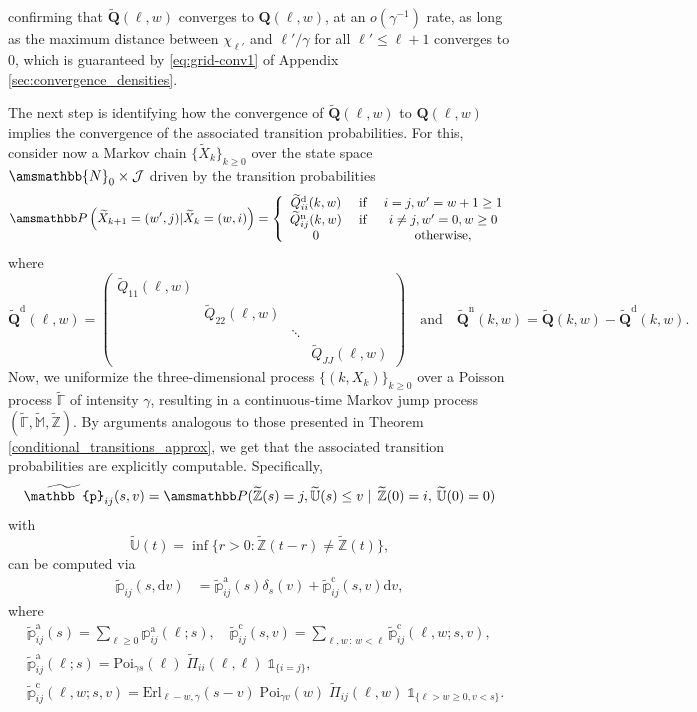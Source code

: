 \documentclass[11pt,leqno]{amsart}
\numberwithin{table}{section}
\numberwithin{figure}{section}
\numberwithin{equation}{section}
\newcommand{\dd}{\mathrm{d}}
\newcommand{\1}{{\mathds{1}}}
\newcommand{\0}{\mat{0}}
\newcommand{\N}{\amsmathbb{N}}
\renewcommand{\P }{{\amsmathbb P}}
\newcommand{\ap}[1]{\mathbb{#1}}
\newcommand{\tld}[1]{\widetilde{#1}}
\newcommand{\apt}[1]{\tld{\mathbb{#1}}}
\begin{document}
confirming that $\tld{\bm{Q}}(\ell,w)$ converges to $\bm{Q}(\ell,w)$, at an $o(\gamma^{-1})$ rate, as long as the maximum distance between $\chi_{\ell'}$ and $\ell'/\gamma$ for all $\ell'\le \ell +1$ converges to $0$, which is guaranteed by \eqref{eq:grid-conv1} of Appendix \ref{sec:convergence_densities}. 

The next step is identifying how the convergence of $\tld{\bm{Q}}(\ell,w)$ to $\bm{Q}(\ell,w)$ implies the convergence of the associated transition probabilities. For this, consider now a Markov chain $\{\tld{X}_k\}_{k\ge 0}$ over the state space $\N_0\times \mathcal{J}$ driven by the transition probabilities
\begin{align*}\P \left(\tld{X}_{k+1}=(w',j)|\tld{X}_{k}=(w,i)\right) = \left\{\begin{array}{ccc}\tld{Q}^{\mathrm{d}}_{ii}(k,w)&\mbox{ if }&i=j, w'=w+1\ge 1\\
\tld{Q}^{\mathrm{n}}_{ij}(k,w)&\mbox{ if }&i\neq j, w'= 0, w\ge 0\\
0&&\mbox{otherwise},\end{array}\right.\end{align*}
where 
\[\tld{\bm{Q}}^{\mathrm{d}}(\ell, w)=\begin{pmatrix} \tld{Q}_{11}(\ell, w)& &&\\&\tld{Q}_{22}(\ell, w)&&\\ &&\ddots& \\ &&& \tld{Q}_{JJ}(\ell, w)\end{pmatrix}\quad\mbox{and}\quad \tld{\bm{Q}}^{\mathrm{n}}(k, w) = \tld{\bm{Q}}(k, w) - \tld{\bm{Q}}^{\mathrm{d}}(k, w).\]
Now, we uniformize the three-dimensional process $\{(k,X_k)\}_{k\ge 0}$ over a Poisson process $\apt{\Gamma}$ of intensity $\gamma$, resulting in a continuous-time Markov jump process $(\apt{\Gamma},\apt{M},\apt{Z})$. By arguments analogous to those presented in Theorem \ref{conditional_transitions_approx}, we get that the associated transition probabilities { are explicitly computable}. Specifically, 
\[\apt{p}_{ij}(s, v) = \P(\apt{Z}(s)=j, \apt{U}(s)\le v \mid \, \apt{Z}(0)=i,\, \apt{U}(0)=0)\]
with 
\begin{equation*}\apt{U}(t)=\inf\{r>0: \apt{Z}(t-r)\neq \apt{Z}(t)\},\end{equation*}
can be computed via 
\begin{align}
\apt{p}_{ij}(s, \dd v) & = \apt{p}_{ij}^{\mathrm{a}}(s)\delta_{s}(v) + \apt{p}_{ij}^{\mathrm{c}}(s, v)\dd v,\label{ltp_2}
\end{align}
where
\begin{align*} 
&\apt{p}_{ij}^{\mathrm{a}}(s) = \sum_{\ell\ge 0} \ap{p}_{ij}^{\mathrm{a}}(\ell; s),\quad\apt{p}_{ij}^{\mathrm{c}}(s,v) = \sum_{\ell, w\,:\, w< \ell} \apt{p}_{ij}^{\mathrm{c}}(\ell, w; s,v),\\
&\apt{p}_{ij}^{\mathrm{a}}(\ell; s) = \mathrm{Poi}_{\gamma s}(\ell)\; \tld{\Pi}_{ii}(\ell, \ell)\;\mathds{1}_{\{i=j\}},\\
&\apt{p}_{ij}^{\mathrm{c}}(\ell, w; s,v) = \mathrm{Erl}_{\ell-w,\gamma}(s-v) \; \mathrm{Poi}_{\gamma v} (w)\; \tld{\Pi}_{ij}(\ell, w)\;\mathds{1}_{\{\ell>w\ge 0, v<s\}}.
\end{align*}
\end{document}
